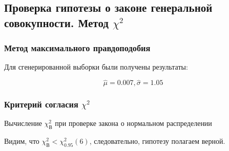 \subsection{Проверка гипотезы о законе генеральной совокупности. Метод $\chi^2$}

\subsubsection{Метод максимального правдоподобия}

Для сгенерированной выборки были получены результаты:

$$\hat{\mu}=0.007, \hat{\sigma}=1.05$$

\subsubsection{Критерий согласия $\chi^2$}

\begin{table}[H]
	\begin{center}
		
		\caption{Вычисление $\chi_{\text{В}}^2$ при проверке закона о нормальном распределении}
	\end{center}
\end{table}

Видим, что $\chi_{\text{В}}^2 < \chi_{0.95}^2(6)$, следовательно, гипотезу полагаем верной.